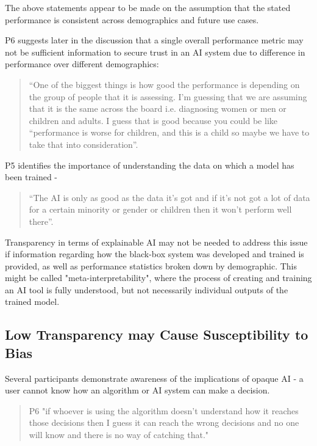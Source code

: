 \documentclass[manuscript,screen,review]{acmart}
\begin{document}
The above statements appear to be made on the assumption that the stated performance is consistent across demographics and future use cases.

P6 suggests later in the discussion that a single overall performance metric may not be sufficient information to secure trust in an AI system due to difference in performance over different demographics:

\begin{quote}
“One of the biggest things is how good the performance is depending on the group of people that it is assessing. I'm guessing that we are assuming that it is the same across the board i.e. diagnosing women or men or children and adults. I guess that is good because you could be like “performance is worse for children, and this is a child so maybe we have to take that into consideration”.
\end{quote}

P5 identifies the importance of understanding the data on which a model has been trained -

\begin{quote}
 “The AI is only as good as the data it's got and if it's not got a lot of data for a certain minority or gender or children then it won't perform well there”.
 \end{quote}
 
 Transparency in terms of explainable AI may not be needed to address this issue if information regarding how the black-box system was developed and trained is provided, as well as performance statistics broken down by demographic. This might be called "meta-interpretability", where the process of creating and training an AI tool is fully understood, but not necessarily individual outputs of the trained model.


\subsection{Low Transparency may Cause Susceptibility to Bias} 
Several participants demonstrate awareness of the implications of opaque AI - a user cannot know how an algorithm or AI system can make a decision.

\begin{quote}
P6  "if whoever is using the algorithm doesn’t understand how it reaches those decisions then I guess it can reach the wrong decisions and no one will know and there is no way of catching that." 
\end{quote}
\end{document}
